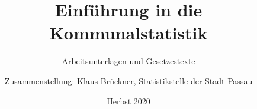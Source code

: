 \documentclass[A4, 12t, headings=optiontoheadandtoc]{scrbook}
\title{Einführung in die Kommunalstatistik}
\subtitle{Arbeitsunterlagen und Gesetzestexte}
\author{Zusammenstellung: Klaus Brückner, Statistikstelle der Stadt Passau}
\date{Herbst 2020}
\begin{document}
\dominitoc
\maketitle
\tableofcontents




% 



















    

\end{document}
